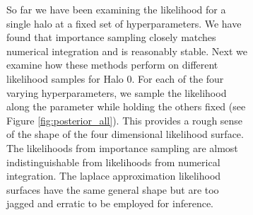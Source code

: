 \documentclass[\docopts]{\docclass}
\begin{document}
\begin{figure}[h!]
\begin{figure}[h!]
So far we have been examining the likelihood for a single halo at a fixed set of hyperparameters. We have found that importance sampling closely matches numerical integration and is reasonably stable. Next we examine how these methods perform on different likelihood samples for Halo 0. For each of the four varying hyperparameters, we sample the likelihood along the parameter while holding the others fixed (see Figure \ref{fig:posterior_all}). This provides a rough sense of the shape of the four dimensional likelihood surface. The likelihoods from importance sampling are almost indistinguishable from likelihoods from numerical integration. The laplace approximation likelihood surfaces have the same general shape but are too jagged and erratic to be employed for inference. 

\begin{figure}[!h]
\centering

\end{figure}
\end{figure}
\end{figure}
\end{document}
